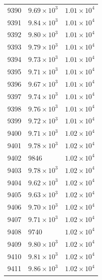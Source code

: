 \begin{table}[H]
\begin{tabular}{lll}
9390 & $\displaystyle 9.69 \times 10^{3}$ & $\displaystyle 1.01 \times 10^{4}$ \\
9391 & $\displaystyle 9.84 \times 10^{3}$ & $\displaystyle 1.01 \times 10^{4}$ \\
9392 & $\displaystyle 9.80 \times 10^{3}$ & $\displaystyle 1.01 \times 10^{4}$ \\
9393 & $\displaystyle 9.79 \times 10^{3}$ & $\displaystyle 1.01 \times 10^{4}$ \\
9394 & $\displaystyle 9.73 \times 10^{3}$ & $\displaystyle 1.01 \times 10^{4}$ \\
9395 & $\displaystyle 9.71 \times 10^{3}$ & $\displaystyle 1.01 \times 10^{4}$ \\
9396 & $\displaystyle 9.67 \times 10^{3}$ & $\displaystyle 1.01 \times 10^{4}$ \\
9397 & $\displaystyle 9.74 \times 10^{3}$ & $\displaystyle 1.01 \times 10^{4}$ \\
9398 & $\displaystyle 9.76 \times 10^{3}$ & $\displaystyle 1.01 \times 10^{4}$ \\
9399 & $\displaystyle 9.72 \times 10^{3}$ & $\displaystyle 1.01 \times 10^{4}$ \\
9400 & $\displaystyle 9.71 \times 10^{3}$ & $\displaystyle 1.02 \times 10^{4}$ \\
9401 & $\displaystyle 9.78 \times 10^{3}$ & $\displaystyle 1.02 \times 10^{4}$ \\
9402 & 9846 & $\displaystyle 1.02 \times 10^{4}$ \\
9403 & $\displaystyle 9.78 \times 10^{3}$ & $\displaystyle 1.02 \times 10^{4}$ \\
9404 & $\displaystyle 9.62 \times 10^{3}$ & $\displaystyle 1.02 \times 10^{4}$ \\
9405 & $\displaystyle 9.63 \times 10^{3}$ & $\displaystyle 1.02 \times 10^{4}$ \\
9406 & $\displaystyle 9.70 \times 10^{3}$ & $\displaystyle 1.02 \times 10^{4}$ \\
9407 & $\displaystyle 9.71 \times 10^{3}$ & $\displaystyle 1.02 \times 10^{4}$ \\
9408 & 9740 & $\displaystyle 1.02 \times 10^{4}$ \\
9409 & $\displaystyle 9.80 \times 10^{3}$ & $\displaystyle 1.02 \times 10^{4}$ \\
9410 & $\displaystyle 9.81 \times 10^{3}$ & $\displaystyle 1.02 \times 10^{4}$ \\
9411 & $\displaystyle 9.86 \times 10^{3}$ & $\displaystyle 1.02 \times 10^{4}$ \\

\end{tabular}
\end{table}
